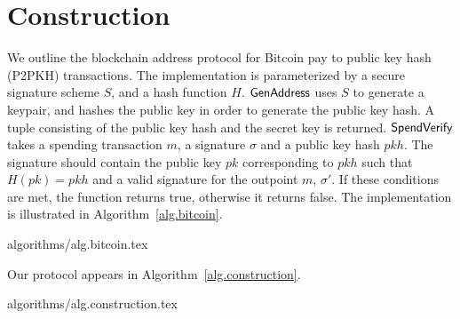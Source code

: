 \section{Construction}\label{section:construction}

We outline the blockchain address protocol for Bitcoin pay to public key hash (P2PKH) transactions. The implementation is parameterized by a secure signature scheme $S$, and a hash function $H$.
$\mathsf{GenAddress}$ uses $S$ to generate a keypair, and hashes the public key in order to generate the public key hash. A tuple consisting of the public key hash and the secret key is returned.
$\mathsf{SpendVerify}$ takes a spending transaction $m$, a signature $\sigma$ and a public key hash $pkh$. The signature should contain the public key $pk$ corresponding to $pkh$ such that $H(pk) = pkh$ and a valid signature for the outpoint $m$, $\sigma'$. If these conditions are met, the function returns true, otherwise it returns false.
The implementation is illustrated in Algorithm~\ref{alg.bitcoin}.

{algorithms/alg.bitcoin.tex}

Our protocol appears in Algorithm~\ref{alg.construction}.

{algorithms/alg.construction.tex}
